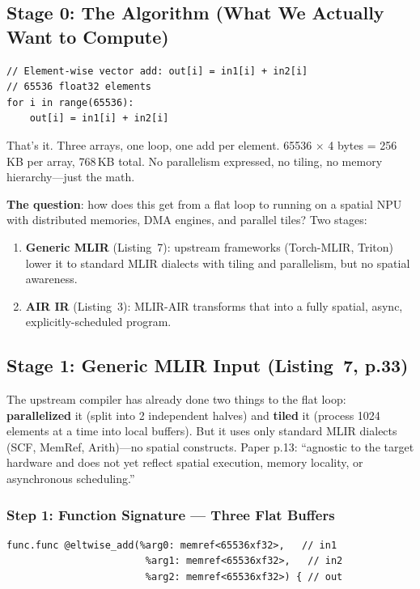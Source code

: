 \documentclass[11pt,a4paper]{article}
\begin{document}
\subsection{Stage 0: The Algorithm (What We Actually Want to Compute)}

\begin{lstlisting}
// Element-wise vector add: out[i] = in1[i] + in2[i]
// 65536 float32 elements
for i in range(65536):
    out[i] = in1[i] + in2[i]
\end{lstlisting}

That's it. Three arrays, one loop, one add per element. 65536 $\times$ 4 bytes =
256\,KB per array, 768\,KB total. No parallelism expressed, no tiling, no memory
hierarchy---just the math.

\textbf{The question}: how does this get from a flat loop to running on a spatial
NPU with distributed memories, DMA engines, and parallel tiles? Two stages:
\begin{enumerate}[leftmargin=2em]
  \item \textbf{Generic MLIR} (Listing~7): upstream frameworks (Torch-MLIR, Triton)
    lower it to standard MLIR dialects with tiling and parallelism, but no spatial
    awareness.
  \item \textbf{AIR IR} (Listing~3): MLIR-AIR transforms that into a fully spatial,
    async, explicitly-scheduled program.
\end{enumerate}


\subsection{Stage 1: Generic MLIR Input (Listing~7, p.33)}

The upstream compiler has already done two things to the flat loop:
\textbf{parallelized} it (split into 2 independent halves) and \textbf{tiled} it
(process 1024 elements at a time into local buffers). But it uses only standard MLIR
dialects (SCF, MemRef, Arith)---no spatial constructs. Paper p.13: ``agnostic to the
target hardware and does not yet reflect spatial execution, memory locality, or
asynchronous scheduling.''

\subsubsection{Step 1: Function Signature --- Three Flat Buffers}
\begin{lstlisting}
func.func @eltwise_add(%arg0: memref<65536xf32>,   // in1
                        %arg1: memref<65536xf32>,   // in2
                        %arg2: memref<65536xf32>) { // out
\end{lstlisting}
\end{document}
